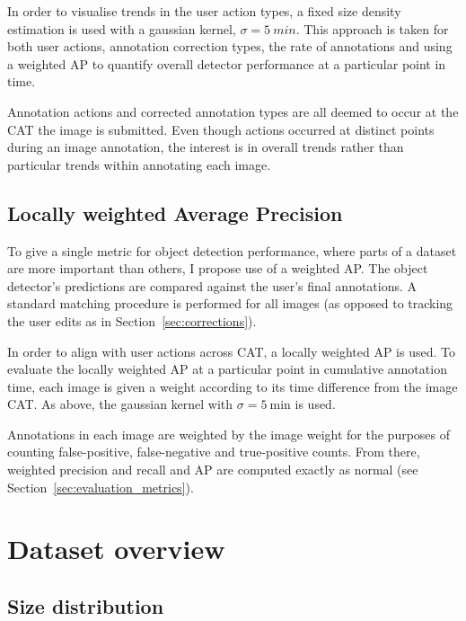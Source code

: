 In order to visualise trends in the user action types, a fixed size density estimation is used with a gaussian kernel, $\sigma=5\:min$. This approach is taken for both user actions, annotation correction types, the rate of annotations and using a weighted \gls{AP} to quantify overall detector performance at a particular point in  time.

Annotation actions and corrected annotation types are all deemed to occur at the \gls{CAT} the image is submitted. Even though actions occurred at distinct points during an image annotation, the interest is in overall trends rather than particular trends within annotating each image. 

\subsection {Locally weighted Average Precision}
\label{sec:noisy_trends}

To give a single metric for object detection performance, where parts of a dataset are more important than others, I propose use of a weighted \gls{AP}. The object detector's predictions are compared against the user's final annotations. A standard matching procedure is performed for all images (as opposed to tracking the user edits as in Section~\ref{sec:corrections}).

In order to align with user actions across \gls{CAT}, a locally weighted \gls{AP} is used. To evaluate the locally weighted \gls{AP} at a particular point in cumulative annotation time, each image is given a weight according to its time difference from the image \gls{CAT}. As above, the gaussian kernel with $\sigma=\SI{5}{\minute}$ is used.

Annotations in each image are weighted by the image weight for the purposes of counting false-positive, false-negative and true-positive counts. From there, weighted precision and recall and \gls{AP} are computed exactly as normal (see Section~\ref{sec:evaluation_metrics}).


\section {Dataset overview}
\subsection {Size distribution}

